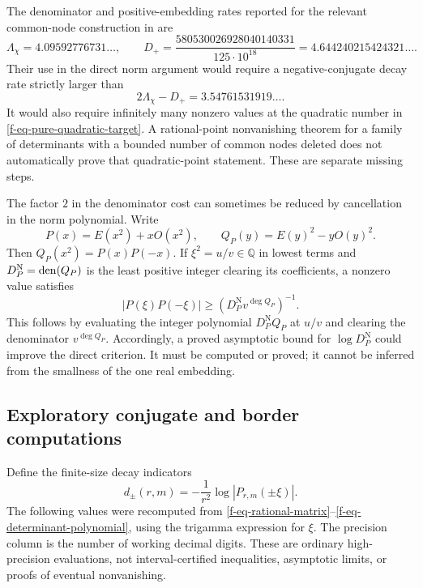 \documentclass[11pt,a4paper]{article}
\theoremstyle{definition}
\theoremstyle{remark}
\begin{document}
The denominator and positive-embedding rates reported for the relevant
common-node construction in \cite{f-litsey} are
\begin{equation}
 \Lambda_\chi=4.09592776731\ldots,
 \qquad
 D_+=\frac{580530026928040140331}{125\cdot10^{18}}
 =4.644240215424321\ldots.
 \label{f-eq-published-rates}
\end{equation}
Their use in the direct norm argument would require a negative-conjugate
decay rate strictly larger than
\begin{equation}
 2\Lambda_\chi-D_+=3.54761531919\ldots.
 \label{f-eq-needed-conjugate-rate}
\end{equation}
It would also require infinitely many nonzero values at the quadratic
number in \eqref{f-eq-pure-quadratic-target}.  A rational-point
nonvanishing theorem for a family of determinants with a bounded number
of common nodes deleted does not automatically prove that quadratic-point
statement.  These are separate missing steps.

The factor $2$ in the denominator cost can sometimes be reduced by
cancellation in the norm polynomial.  Write
\begin{equation}
 P(x)=E(x^2)+xO(x^2),\qquad
 Q_P(y)=E(y)^2-yO(y)^2.
 \label{f-eq-norm-polynomial}
\end{equation}
Then $Q_P(x^2)=P(x)P(-x)$.  If $\xi^2=u/v\in\mathbb Q$ in lowest
terms and $D_P^{\mathrm N}=\operatorname{den}(Q_P)$ is the least positive integer
clearing its coefficients, a nonzero value satisfies
\begin{equation}
 |P(\xi)P(-\xi)|\ge
 (D_P^{\mathrm N}v^{\deg Q_P})^{-1}.
 \label{f-eq-rational-norm-lower}
\end{equation}
This follows by evaluating the integer polynomial
$D_P^{\mathrm N}Q_P$ at $u/v$ and clearing the denominator
$v^{\deg Q_P}$.  Accordingly, a proved asymptotic bound for
$\log D_P^{\mathrm N}$ could improve the direct criterion.  It must be
computed or proved; it cannot be inferred from the smallness of the one
real embedding.

\subsection{Exploratory conjugate and border computations}
\label{f-sub-numerical-tables}

Define the finite-size decay indicators
\[
 d_\pm(r,m)=-\frac1{r^2}\log|P_{r,m}(\pm\xi)|.
\]
The following values were recomputed from
\eqref{f-eq-rational-matrix}--\eqref{f-eq-determinant-polynomial}, using
the trigamma expression for $\xi$.  The precision column is the number
of working decimal digits.  These are ordinary high-precision evaluations,
not interval-certified inequalities, asymptotic limits, or proofs of
eventual nonvanishing.
\end{document}
